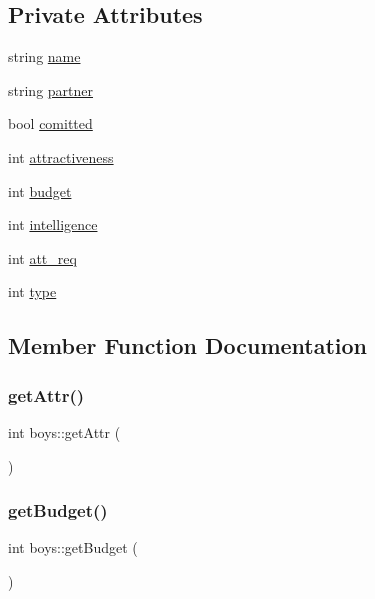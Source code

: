 \subsection*{Private Attributes}
\begin{DoxyCompactItemize}
\item 
string \hyperlink{classinfo_1_1boys_a5f5459042253e697a1ad8f70ec32621f}{name}
\item 
string \hyperlink{classinfo_1_1boys_a650dc47ff63c486af4c4e722d7335e80}{partner}
\item 
bool \hyperlink{classinfo_1_1boys_a806236f8c7774cb48fb10c75d08dae6f}{comitted}
\item 
int \hyperlink{classinfo_1_1boys_ae72b1ebdaa36a3183e9f7c8a49aa6518}{attractiveness}
\item 
int \hyperlink{classinfo_1_1boys_a500cea9998dee3ed6374c6c8901f06dd}{budget}
\item 
int \hyperlink{classinfo_1_1boys_ab7f71eef81fdee234ae5d3f9e8e38597}{intelligence}
\item 
int \hyperlink{classinfo_1_1boys_a33eafce307ea93979f15f04a203949f8}{att\+\_\+req}
\item 
int \hyperlink{classinfo_1_1boys_afc46ebbbf8a5e80edbf86fecd5893590}{type}
\end{DoxyCompactItemize}


\subsection{Member Function Documentation}
\mbox{\label{classinfo_1_1boys_ab8a0f1fd17174e3043e10381d69e7422}} 
\subsubsection{\texorpdfstring{get\+Attr()}{getAttr()}}
{\footnotesize\ttfamily int boys\+::get\+Attr (\begin{DoxyParamCaption}{ }\end{DoxyParamCaption})}

\mbox{\label{classinfo_1_1boys_af2916ef8a490e67d788f6dae2a1ed529}} 
\subsubsection{\texorpdfstring{get\+Budget()}{getBudget()}}
{\footnotesize\ttfamily int boys\+::get\+Budget (\begin{DoxyParamCaption}{ }\end{DoxyParamCaption})}

